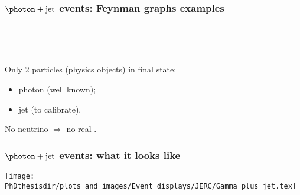 \begin{frame}
\frametitle{$\photon+\text{jet}$ events: Feynman graphs examples}
~\hfill

\hfill\hfill\hfill

\hfill\hfill\hfill

\hfill~

\pause
\vfill

\manip Only 2 \og particles \fg{} (physics objects) in final state:
\begin{itemize}
\item photon (well known);
\item jet (to calibrate).
\end{itemize}
\manip No neutrino $\Rightarrow$ no real \MET.
\end{frame}

\begin{frame}
\frametitle{$\photon+\text{jet}$ events: what it looks like}
\begin{center}
\texttt{[image: \\PhDthesisdir/plots\_and\_images/Event\_displays/JERC/Gamma\_plus\_jet.tex]}
\end{center}
\end{frame}
